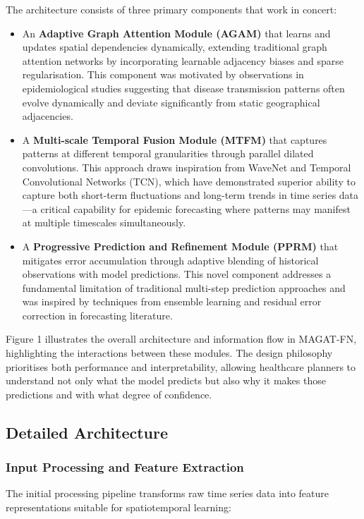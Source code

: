 \documentclass[lettersize, journal]{IEEEtran}
\begin{document}
The architecture consists of three primary components that work in concert:

\begin{itemize}
    \item An \textbf{Adaptive Graph Attention Module (AGAM)} that learns and updates spatial dependencies dynamically, extending traditional graph attention networks by incorporating learnable adjacency biases and sparse regularisation. This component was motivated by observations in epidemiological studies suggesting that disease transmission patterns often evolve dynamically and deviate significantly from static geographical adjacencies.
    
    \item A \textbf{Multi-scale Temporal Fusion Module (MTFM)} that captures patterns at different temporal granularities through parallel dilated convolutions. This approach draws inspiration from WaveNet and Temporal Convolutional Networks (TCN), which have demonstrated superior ability to capture both short-term fluctuations and long-term trends in time series data—a critical capability for epidemic forecasting where patterns may manifest at multiple timescales simultaneously.
    
    \item A \textbf{Progressive Prediction and Refinement Module (PPRM)} that mitigates error accumulation through adaptive blending of historical observations with model predictions. This novel component addresses a fundamental limitation of traditional multi-step prediction approaches and was inspired by techniques from ensemble learning and residual error correction in forecasting literature.
\end{itemize}

Figure 1 illustrates the overall architecture and information flow in MAGAT-FN, highlighting the interactions between these modules. The design philosophy prioritises both performance and interpretability, allowing healthcare planners to understand not only what the model predicts but also why it makes those predictions and with what degree of confidence.

\subsection{Detailed Architecture}

\subsubsection{Input Processing and Feature Extraction}
The initial processing pipeline transforms raw time series data into feature representations suitable for spatiotemporal learning:
\end{document}

